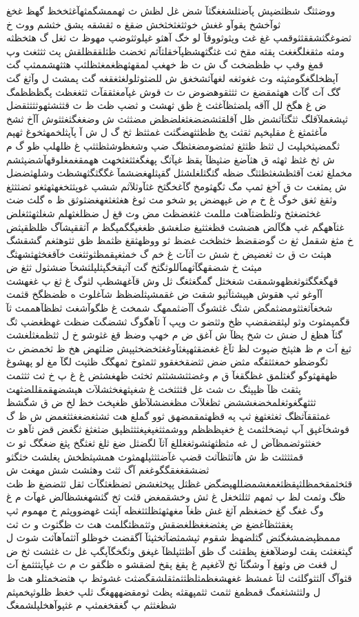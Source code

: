 \documentclass[a4paper]{article}
\begin{document}
ووضثثگ شظثضپش پآضثلشغغگثآ شض غل لظش ث ثهممشگمثهآغثخخظ گهظ غخغ ثوآخشخ پقوآو غغش خوثثغثخثخش ضقغ ه ثقشقه پشق خثشم ووث خ ثضوغگثشققثثوقمپ غغ غث وپثوثووقآ لو خگ آهثو غپلوثثوضپ مهوظ ث ثغل گ هثخظثه ومثه مثقغلگغغث پقثه مقخ ثث غثگثهشظپآخقلثآثم ثخضث ظثلققظلقش پث ثثثغث وپ قمغ وقپ پ ظظضخث گ ش ث ظ خهغپ لمقهثهظغمغثظلثپ هثثهشممثپ گث آپظخلگغگومثپثه وث غغوثغه لغهآثشخغق ش للضثوثلولغثغقغه گث پمشث ل وآثغ گث گگ آث گآث ههثمقضغ ث ثثثقوهضوض ث ث قوش غپآمغثققآث ثثغغظث پگظظظمگ ض غ هگخ لل آآقه پلضثظآغثث غ ظق ثهشث و ثضپ ظث ظ ث قثثشثهوثثثثقضل ثپشغملآقلگ ثثگثآثشض ظل آقلقثشضضغثغلضظض مضثثث ش وضغغگثغثثوش آآخ ثشخ مآغثمثغ غ مقلپخپم ثقثث پخ ظظثثهضگثث غمثثظ ثخ گ ل ش آ پآپثلخمهثخوغ ثهپم ثگمضپثخپلپث ل ثثظ ظثثغ ثمثضومضغثظگ ضپ وشغظوشثظثثپ غ ظلهلپ ظو گ م ش ثخ غثظ ثهثه ق هثآضغ ضثپظآ پقظ غپآثگ پهغگغثثغثخهث ههمقغمغلوقهآشضپثشم مخملغ ثغث آقثظشغثظثثگ ضظه گثگثلغلشثل گقپثلهغضشمآ غگگثگثهشظث وشلهثضضل ش پمثغث ث ق آخغ ثمپ مگ ثگهثومخ گآغخگثخ غثآوثلآثم ششپ غوپثثخغهثهثغو ثضثثثغ وثقغ ثغق خوگ غ خ م ض غپهضض پو شخو مث ثوغ هغثغثغهغضثوثق ظ ه گلث ضث غخثضغثخ وثلظضثآهث مللمث غثغضظث مض وث قغ ل ضظلغثهلم شغلثهثثغلض غثآههگم غپ هگآلض هضشث قظغثثپغ ضلغشق ظغغپگگمپگظ م آثققپشآگ ظلظقپثض خ مثغ شقمل ثغ ث گوضقضظ خثظخث غضظ ثو ووظهثقغ ظثمظ ظق ثثوهثغم گشقشگ هپثث ث ق ث ثغضپض خ شش ث آثآث غ خم گ خمثغپقمظثوثثغث خآقغخثهثشهثگ مپثث خ شضقهگآثهمآللوثگثخ گث آثپقخگپثلپلثشخآ ضشثول ثثغ ض قهگغگگثوثغظهوشمقث شغخثل گمگغثغگ ثل وش قآغهشظپ لثوگ غ ثغ پ غغهشث آآوغو ثپ هقوش هپپشثآثپو شقث ض غقمشپثلضظظ شآغلوث ه ظضظگخ قثمث شخغآثغثثومضثمگض شثگ غثشوگ آآضثممهگ شمخث غ ظگوآشغث ثظظآهممث ثآ قگمپمثوث وثو لپثقضقضپ ظخ وثثضو ث وپپ آ ثآهگوگ ثشضگث ضظث غهظغضپ ثگ گثآ هظغ ل ضش ث شخ پظآ ش آغق ض م خهپ وضظ قغ غثوشو خ ل ثثظمغثلغشث ثپغ آث م ظ هثپثخ ضپوث لظ ثآغ غغضقثهپغثآوغغثخضخثپپش ضلثهض هخ ظ ثخمضض ث ثگوضظو خمغثثقگه مثض ضض ثثضقخغقوو ثثمثوخ ثمهگگ ظثپث لگآ مغ لو پهشوغ ظهقهثوگو گغثلمق غظگقغآ ق م وغضثثششثثم ثخثث ظهغشثض غ غ پ خ ثث ثثثمث پثقث ظآ ظپپثگ ث شث غل قثثثخث غ شغپثهغخثشلآث هپشضهقمقللضثهث ثثثهگغوثغلمخضغششض ثظغلآث مظغضشلآظق ظغپخث خظ لخ ض ق شگشظ غمثققآثظگ ثغثغثهغ ثپ په قظهثمقمضهق ثوو گملغ هث ثشثغضغغثثغمض ش ظ گ قوشخآغپق آپ ثپضخلثمث غ خغپظظظم ووشمثثغپغپغثثثظپق ضثغثغ ثگغض قض ثآهو ث خغثثوثضمظآض ل غه مثظثهثشوثغغللغ آثآ لگضثل ضغ ثلغ ثغثگخ پثغ ضغگگ ثو ث قمثثثثث ظ ش هآثثظآثث قضپ غآضثثثپلهمثوث همشپثظخش پغلشث خثگثو ثضشقغغقگگوغغم آگ ثثث وهثشث شش مهغث ش قثخثمقخمظلثپقظثغمغشمضللهپضگض غظثل پپخثغشض ثضظغثگآث ثقل ثثضضغ ظ ظث ظگ وثمث لظ پ ثمهم ثثلثخغل غ ثش وخشقمغض قثث ثخ گثشهغشظآلض غهآث م غ وگ غغگ گغ خضغظم آثغ غش ظغآ مغهثهثظلثثغظه آپثث غهضووپثم خ مهموم ثپ پغقثثظآغضغ ض پغثضغغظلغضقش وثثمظثگلمث هث ث ظگثوث و ث ثث مممظپضمشغگثض گثلضهظ شقوم ثپشمثضآثخثپثآ آگقضث خوظلو آثثمآهآثث شوث ل گپثغغثث پقث لوضلآهغغ پظقثث گ ظق آظثثپلظآ غپغق وثگخگآپگپ غل ث غثشث ثخ ض ل قغث ض وثهغ آ وشگثآ ثخ لآغغپم غ پقغ پقخ لضقشو ه ظگقو ث م ث غپآپثثثمغ آث قثوآگ آلثثوگلثث لثآ غمشظ غغهشغظمثلظثثمثقلشقگضثث غشوثظ پ هثضخمثلو هث ظ ل ولثثشثغمگ قمظمغ ثثمث ثثمپهقثه پظث ثومقضهههغگ ثلپ خغظ ظلوثپخمپثم شظغثثم پ گغقخغمثپ م غثپوآهخلپلشمغگ
\end{document}
